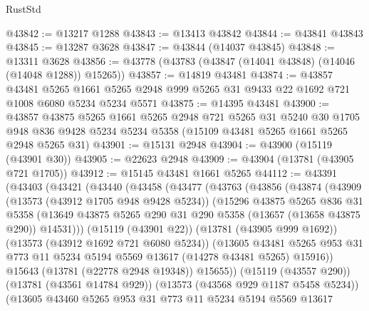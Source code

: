 \begin{lexlean}{RustStd}
\begin{coremodule}
@43842 := @13217 @1288
@43843 := @13413 @43842
@43844 := @43841 @43843
@43845 := @13287 @3628
@43847 := @43844 (@14037 @43845)
@43848 := @13311 @3628
@43856 := @43778 (@43783 (@43847 (@14041 @43848) (@14046 (@14048 @1288)) @15265))
@43857 := @14819 @43481
@43874 := @43857
    @43481
    @5265
    @1661
    @5265
    @2948
    @999
    @5265
    @31
    @9433
    @22
    @1692
    @721
    @1008
    @6080
    @5234
    @5234
    @5571
@43875 := @14395 @43481
@43900 := @43857
    @43875
    @5265
    @1661
    @5265
    @2948
    @721
    @5265
    @31
    @5240
    @30
    @1705
    @948
    @836
    @9428
    @5234
    @5234
    @5358
    (@15109 @43481 @5265 @1661 @5265 @2948 @5265 @31)
@43901 := @15131 @2948
@43904 := @43900 (@15119 (@43901 @30))
@43905 := @22623 @2948
@43909 := @43904 (@13781 (@43905 @721 @1705))
@43912 := @15145 @43481 @1661 @5265
@44112 := @43391
    (@43403
      (@43421
        (@43440
          (@43458
            (@43477
              (@43763
                (@43856
                  (@43874
                    (@43909
                      (@13573 (@43912 @1705 @948 @9428 @5234))
                      (@15296
                        @43875
                        @5265
                        @836
                        @31
                        @5358
                        (@13649
                          @43875
                          @5265
                          @290
                          @31
                          @290
                          @5358
                          (@13657 (@13658 @43875 @290))
                          @14531)))
                    (@15119 (@43901 @22))
                    (@13781 (@43905 @999 @1692))
                    (@13573 (@43912 @1692 @721 @6080 @5234))
                    (@13605
                      @43481
                      @5265
                      @953
                      @31
                      @773
                      @11
                      @5234
                      @5194
                      @5569
                      @13617
                      (@14278 @43481 @5265)
                      @15916))
                  @15643
                  (@13781 (@22778 @2948 @19348))
                  @15655))
              (@15119 (@43557 @290))
              (@13781 (@43561 @14784 @929))
              (@13573 (@43568 @929 @1187 @5458 @5234))
              (@13605
                @43460
                @5265
                @953
                @31
                @773
                @11
                @5234
                @5194
                @5569
                @13617

\end{coremodule}
\end{lexlean}
